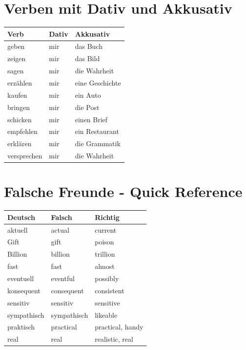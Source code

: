 \section{Verben mit Dativ und Akkusativ}

\bigskip
\begin{center}
\begin{tabular}{|l|l|l|}
\hline
Verb & Dativ & Akkusativ \\ \hline
geben & mir & das Buch \\ \hline
zeigen & mir & das Bild \\ \hline
sagen & mir & die Wahrheit \\ \hline
erzählen & mir & eine Geschichte \\ \hline
kaufen & mir & ein Auto \\ \hline
bringen & mir & die Post \\ \hline
schicken & mir & einen Brief \\ \hline
empfehlen & mir & ein Restaurant \\ \hline
erklären & mir & die Grammatik \\ \hline
versprechen & mir & die Wahrheit \\ \hline
\end{tabular}
\end{center}

\section{Falsche Freunde - Quick Reference}

\bigskip
\begin{center}
\begin{tabular}{|l|l|l|}
\hline
Deutsch & Falsch & Richtig \\ \hline
aktuell & actual & current \\ \hline
Gift & gift & poison \\ \hline
Billion & billion & trillion \\ \hline
fast & fast & almost \\ \hline
eventuell & eventful & possibly \\ \hline
konsequent & consequent & consistent \\ \hline
sensitiv & sensitiv & sensitive \\ \hline
sympathisch & sympathisch & likeable \\ \hline
praktisch & practical & practical, handy \\ \hline
real & real & realistic, real \\ \hline
\end{tabular}
\end{center}

